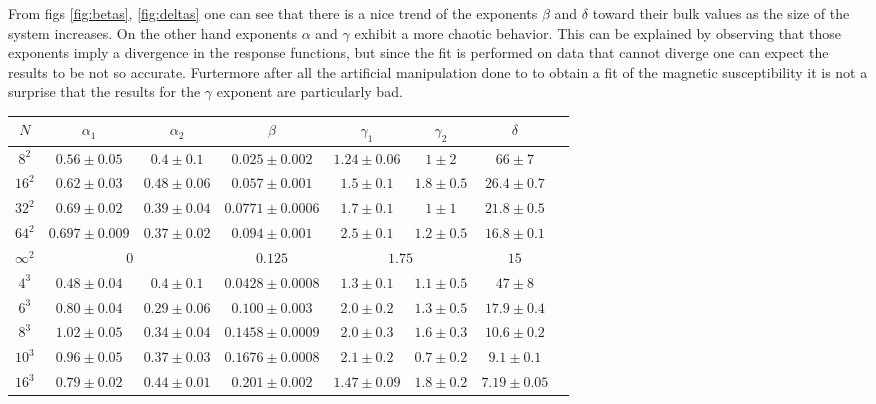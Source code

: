 \documentclass[a4paper, 11pt]{article}
\begin{document}
      From figs \ref{fig:betas}, \ref{fig:deltas} one can see that there is a nice trend of the exponents $\beta$ and $\delta$ toward their bulk values as the size of the system increases. On the other hand exponents $\alpha$ and $\gamma$ exhibit a more chaotic behavior. This can be explained by observing that those exponents imply a divergence in the response functions, but since the fit is performed on data that cannot diverge one can expect the results to be not so accurate. Furtermore after all the artificial manipulation done to to obtain a fit of the magnetic susceptibility it is not a surprise that the results for the $\gamma$ exponent are particularly bad.

      \begin{table}
        \centering
        \begin{tabular}{c|ccccccc}
          \toprule
          $N$ & $\alpha_1$ & $\alpha_2$ & $\beta$ & $\gamma_1$ & $\gamma_2$ & $\delta$ \\
          \midrule
          $8^2$ & $0.56 \pm 0.05$ & $0.4 \pm 0.1$ & $0.025 \pm 0.002$ & $1.24 \pm 0.06$ & $1 \pm 2$ & $66 \pm 7$\\
          $16^2$ & $0.62 \pm 0.03$ & $0.48 \pm 0.06$ & $0.057 \pm 0.001$ & $1.5 \pm 0.1$ & $1.8 \pm 0.5$ & $26.4 \pm 0.7$\\
          $32^2$ & $0.69 \pm 0.02$ & $0.39 \pm 0.04$ & $0.0771 \pm 0.0006$ & $1.7 \pm 0.1$ & $1 \pm 1$ & $21.8 \pm 0.5$\\
          $64^2$ & $0.697 \pm 0.009$ & $0.37 \pm 0.02$ & $0.094 \pm 0.001$ & $2.5 \pm 0.1$ & $1.2 \pm 0.5$ & $16.8 \pm 0.1$\\
          $\infty^2$ & \multicolumn{2}{c}{$0$} & $0.125$ & \multicolumn{2}{c}{$1.75$} & $15$\\
          \midrule
          $4^3$ & $0.48 \pm 0.04$ & $0.4 \pm 0.1$ & $0.0428 \pm 0.0008$ & $1.3 \pm 0.1$ & $1.1 \pm 0.5$ & $47 \pm 8$\\
          $6^3$ & $0.80 \pm 0.04$ & $0.29 \pm 0.06$ & $0.100 \pm 0.003$ & $2.0 \pm 0.2$ & $1.3 \pm 0.5$ & $17.9 \pm 0.4$\\
          $8^3$ & $1.02 \pm 0.05$ & $0.34 \pm 0.04$ & $0.1458 \pm 0.0009$ & $2.0 \pm 0.3$ & $1.6 \pm 0.3$ & $10.6 \pm 0.2$\\
          $10^3$ & $0.96 \pm 0.05$ & $0.37 \pm 0.03$ & $0.1676 \pm 0.0008$ & $2.1 \pm 0.2$ & $0.7 \pm 0.2$ & $9.1 \pm 0.1$\\
          $16^3$ & $0.79 \pm 0.02$ & $0.44 \pm 0.01$ & $0.201 \pm 0.002$ & $1.47 \pm 0.09$ & $1.8 \pm 0.2$ & $7.19 \pm 0.05$\\

\end{tabular}
\end{table}
\end{document}
